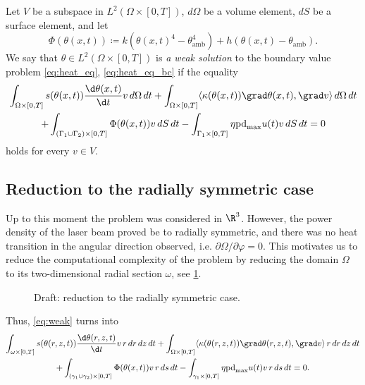 \begin{definition}
	Let $V$ be a subspace in $L^2(\Omega \times [0,T])$, $d\Omega$ be a volume element, $dS$ be a surface element, and let
	\begin{equation*}
		\Phi(\theta(x,t)) \coloneqq k (\theta(x,t)^4 - \theta_\text{amb}^4) + h (\theta(x,t) - \theta_\text{amb}).
	\end{equation*}
	We say that $\theta \in L^2(\Omega \times [0,T])$ is \emph{a weak solution} to the boundary value problem \eqref{eq:heat_eq}, \eqref{eq:heat_eq_bc} if the equality
	\begin{multline} \label{eq:weak}
		\int_{\Omega \times [0,T]} s(\theta(x,t)) \frac{\d \theta(x,t)}{\d t} v\, d\Omega\, dt
		+
		\int_{\Omega \times [0,T]} \langle \kappa(\theta(x,t)) \grad\theta(x,t), \grad v \rangle \, d\Omega\, dt \\
		+
		\int_{(\Gamma_1 \cup \Gamma_2) \times [0,T]} \Phi(\theta(x,t)) v\, dS\, dt -
		\int_{\Gamma_1 \times [0,T]} \eta \text{pd}_{\max} u(t) v\, dS\, dt = 0
	\end{multline}
	holds for every $v\in V$.
\end{definition}


\subsection{Reduction to the radially symmetric case}

Up to this moment the problem was considered in $\R^3$.
However, the power density of the laser beam proved be to radially symmetric, and there was no heat transition in the angular direction observed, i.e. $\partial\Omega/\partial\varphi = 0$. This motivates us to reduce the computational complexity of the problem by reducing the domain $\Omega$ to its two-dimensional radial section $\omega$, see \cref{fig:sec}.

\begin{figure}
	\centering
	
	
	\caption{Draft: reduction to the radially symmetric case.}
	\label{fig:sec}
\end{figure}

Thus, \eqref{eq:weak} turns into
\begin{multline} \label{eq:weak_reduced}
	\int_{\omega \times [0,T]} s(\theta(r,z,t)) \frac{\d \theta(r,z,t)}{\d t} v\, r\, dr\, dz\, dt
	+
	\int_{\Omega \times [0,T]} \langle \kappa(\theta(r,z,t)) \grad\theta(r,z,t), \grad v \rangle \, r\, dr\, dz\, dt \\
	+
	\int_{(\gamma_1 \cup \gamma_2) \times [0,T]} \Phi(\theta(x,t)) v\, r\, ds\, dt -
	\int_{\gamma_1 \times [0,T]} \eta \text{pd}_{\max} u(t) v\, r\, ds\, dt = 0.
\end{multline}

